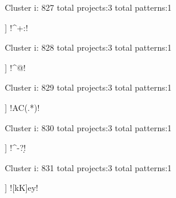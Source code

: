 Cluster i: 827
total projects:3
total patterns:1
\begin{multicols}{1}
\begin{description}[noitemsep,topsep=0pt]
\item [[3] ] \cverb!^\w+:!
\end{description}
\end{multicols}







Cluster i: 828
total projects:3
total patterns:1
\begin{multicols}{1}
\begin{description}[noitemsep,topsep=0pt]
\item [[3] ] \cverb!^\s*@!
\end{description}
\end{multicols}







Cluster i: 829
total projects:3
total patterns:1
\begin{multicols}{1}
\begin{description}[noitemsep,topsep=0pt]
\item [[3] ] \cverb!AC(.*)!
\end{description}
\end{multicols}







Cluster i: 830
total projects:3
total patterns:1
\begin{multicols}{1}
\begin{description}[noitemsep,topsep=0pt]
\item [[3] ] \cverb!^-?\d!
\end{description}
\end{multicols}







Cluster i: 831
total projects:3
total patterns:1
\begin{multicols}{1}
\begin{description}[noitemsep,topsep=0pt]
\item [[3] ] \cverb![kK]ey!
\end{description}
\end{multicols}







